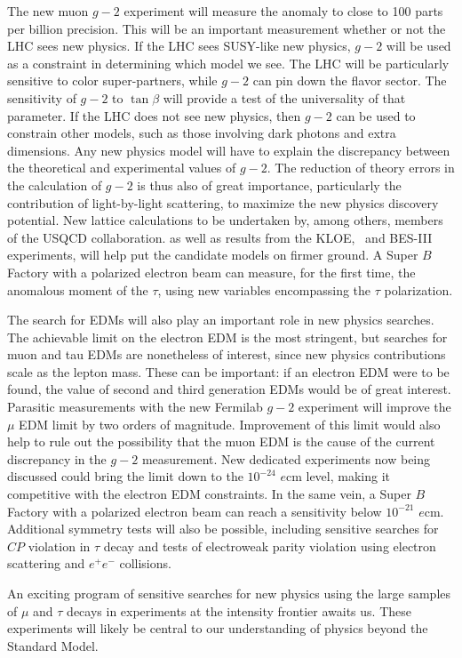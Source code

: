 The new muon $g\!\!-\!\!2$ experiment will measure the anomaly to close to 100 parts per billion precision. This will be an important measurement whether or not the LHC sees new physics. If the LHC sees SUSY-like new physics, $g\!\!-\!\!2$ will be used as a constraint in determining which model we see. The LHC will be particularly sensitive to color super-partners, while $g\!\!-\!\!2$ can pin down the flavor sector. The sensitivity of $g\!\!-\!\!2$ to $\tan\beta$ will provide a test of the universality of that parameter. If the LHC does not see new physics, then $g\!\!-\!\!2$ can be used to constrain other models, such as those involving dark photons and extra dimensions. Any new physics model will have to explain the discrepancy between the theoretical and experimental values of $g\!\!-\!\!2$.
The reduction of theory errors in the calculation of $g\!\!-\!\!2$ is thus also of great importance, particularly the contribution of light-by-light scattering, to maximize the new physics discovery potential.
New lattice calculations to be undertaken by, among others, members of the USQCD collaboration. as well as results from the KLOE, \babar\ and BES-III experiments, will help put the candidate models on firmer ground. A Super $B$ Factory with a polarized electron beam can measure, for the first time, the anomalous moment of the $\tau$, using new variables encompassing the $\tau$ polarization.


The search for EDMs will also play an important role in new physics
searches. The achievable limit on the electron EDM is the most stringent, but searches for muon and tau EDMs are nonetheless of interest, since new physics contributions scale as the lepton mass. These can be
important: if an electron EDM were to be found, the value of second and third generation EDMs would be of great interest.  Parasitic measurements with the new Fermilab $g\!\!-\!\!2$ experiment will improve the $\mu$ EDM limit by two
orders of magnitude. Improvement of this limit would also help to rule out
the possibility that the muon EDM is the cause of the current discrepancy in the
$g\!\!-\!\!2$ measurement. New dedicated experiments now being discussed
could bring the limit down to the $10^{-24}$ $e$cm level, making it
competitive with the electron EDM constraints. In the same vein, a Super $B$ Factory with a polarized electron beam can reach a sensitivity below $10^{-21}$ $e$cm.
Additional symmetry tests will also be possible, including sensitive searches for $C\!P$ violation in $\tau$ decay and 
tests of electroweak parity violation using electron scattering and $e^+e^-$ collisions. 

An exciting program of sensitive searches for new physics using the large samples of $\mu$ and $\tau$ decays in experiments at the intensity frontier awaits us. These experiments will likely be central to our understanding of physics beyond the Standard Model.